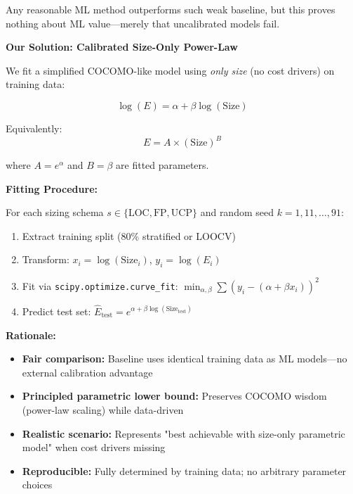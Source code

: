 \documentclass[11pt,a4paper]{article}
\begin{document}
Any reasonable ML method outperforms such weak baseline, but this proves nothing about ML value---merely that uncalibrated models fail.

\textbf{Our Solution: Calibrated Size-Only Power-Law}

We fit a simplified COCOMO-like model using \textit{only size} (no cost drivers) on training data:

\begin{equation}
\log(E) = \alpha + \beta \log(\text{Size})
\label{eq:calibrated-baseline}
\end{equation}

Equivalently:
\begin{equation}
E = A \times (\text{Size})^B
\end{equation}

where $A = e^{\alpha}$ and $B = \beta$ are fitted parameters.

\textbf{Fitting Procedure:}

For each sizing schema $s \in \{\text{LOC}, \text{FP}, \text{UCP}\}$ and random seed $k = 1, 11, \ldots, 91$:

\begin{enumerate}
    \item Extract training split (80\% stratified or LOOCV)
    \item Transform: $x_i = \log(\text{Size}_i)$, $y_i = \log(E_i)$
    \item Fit via \texttt{scipy.optimize.curve\_fit}: $\min_{\alpha, \beta} \sum (y_i - (\alpha + \beta x_i))^2$
    \item Predict test set: $\hat{E}_{\text{test}} = e^{\alpha + \beta \log(\text{Size}_{\text{test}})}$
\end{enumerate}

\textbf{Rationale:}

\begin{itemize}
    \item \textbf{Fair comparison:} Baseline uses identical training data as ML models---no external calibration advantage
    \item \textbf{Principled parametric lower bound:} Preserves COCOMO wisdom (power-law scaling) while data-driven
    \item \textbf{Realistic scenario:} Represents "best achievable with size-only parametric model" when cost drivers missing
    \item \textbf{Reproducible:} Fully determined by training data; no arbitrary parameter choices
\end{itemize}
\end{document}
